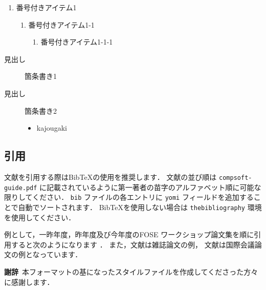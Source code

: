 \documentclass[T,J]{fose} %
\begin{document}
\begin{enumerate}
	\item 番号付きアイテム1
	\begin{enumerate}
		\item 番号付きアイテム1-1
		\begin{enumerate}
			\item 番号付きアイテム1-1-1
		\end{enumerate}
	\end{enumerate}
\end{enumerate}

\begin{description}
	\item[見出し] 箇条書き1
	\item[見出し] 箇条書き2
		\begin{itemize}
			\item kajougaki
		\end{itemize}
\end{description}


\subsection{引用}

文献を引用する際はBibTeXの使用を推奨します．
文献の並び順は \texttt{compsoft-guide.pdf} に記載されているように第一著者の苗字のアルファベット順に可能な限りしてください．
\texttt{bib} ファイルの各エントリに \texttt{yomi} フィールドを追加することで自動でソートされます．
BibTeXを使用しない場合は \texttt{thebibliography} 環境を使用してください．

例として，一昨年度，昨年度及び今年度のFOSE ワークショップ論文集を順に引用すると次のようになります
\cite{fose2024}\cite{fose2025}\cite{fose2026}．
また，文献\cite{sample_journal}は雑誌論文の例，
文献\cite{sample_conference}は国際会議論文の例となっています．


\textbf{謝辞}\
本フォーマットの基になったスタイルファイルを作成してくださった方々に感謝します．



\end{document}
